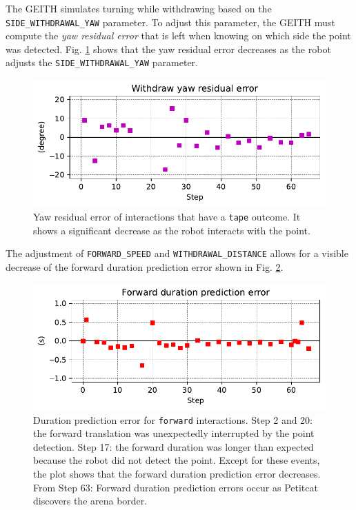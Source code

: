 \documentclass[runningheads]{llncs}
\begin{document}
The GEITH simulates turning while withdrawing based on the \texttt{SIDE\_WITH\-DRA\-WAL\_YAW} parameter.
To adjust this parameter, the GEITH must 
compute the \textit{yaw residual error} 
that is left when knowing on which side the point was detected. 
Fig. \ref{fig:yaw_re} shows that the yaw residual error decreases as the robot adjusts the \texttt{SIDE\_WITH\-DRA\-WAL\_YAW} parameter.

\begin{figure}
	\includegraphics[width=\textwidth]{03_yaw_re.pdf}
	\caption{Yaw residual error of interactions that have a \texttt{tape} outcome. 
		It shows a significant decrease as the robot interacts with the point.
	} \label{fig:yaw_re}
\end{figure}

The adjustment of \texttt{FORWARD\_SPEED} and \texttt{WITHDRAWAL\_DIS\-TANCE} allows for a visible decrease of the forward duration prediction error shown in Fig. \ref{fig:forward_re}.

\begin{figure}
	\includegraphics[width=\textwidth]{07_Forward_duration_pe.pdf}
	\caption{Duration prediction error for \texttt{forward} interactions.
	Step 2 and 20: the forward translation was unexpectedly interrupted by the point detection.
	Step 17: the forward duration was longer than expected because the robot did not detect the point.
	Except for these events, the plot shows that the forward duration prediction error decreases.
	From Step 63: Forward duration prediction errors occur as Petitcat discovers the arena border.
	} \label{fig:forward_re}
\end{figure}
\end{document}
